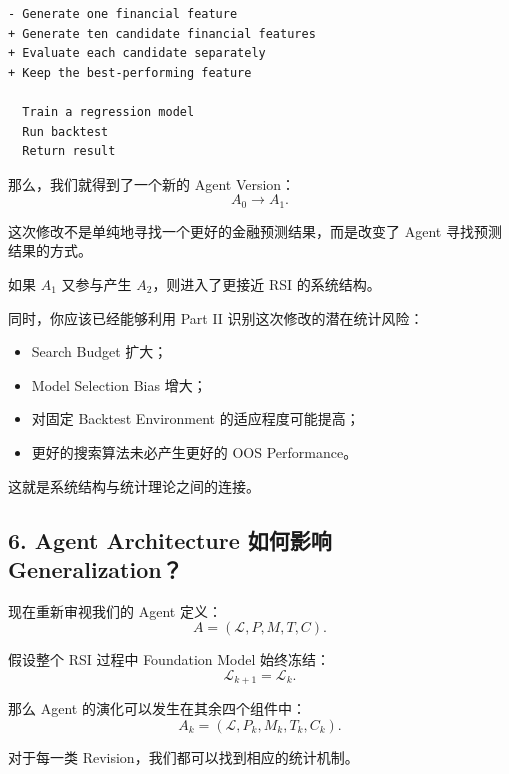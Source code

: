 \begin{verbatim}
- Generate one financial feature
+ Generate ten candidate financial features
+ Evaluate each candidate separately
+ Keep the best-performing feature

  Train a regression model
  Run backtest
  Return result
\end{verbatim}

那么，我们就得到了一个新的 Agent Version：
\[A_0\longrightarrow A_1.\]

这次修改不是单纯地寻找一个更好的金融预测结果，而是改变了 Agent 寻找预测结果的方式。

如果 \(A_1\) 又参与产生 \(A_2\)，则进入了更接近 RSI 的系统结构。

同时，你应该已经能够利用 Part II 识别这次修改的潜在统计风险：

\begin{itemize}
\tightlist
\item
  Search Budget 扩大；
\item
  Model Selection Bias 增大；
\item
  对固定 Backtest Environment 的适应程度可能提高；
\item
  更好的搜索算法未必产生更好的 OOS Performance。
\end{itemize}

这就是系统结构与统计理论之间的连接。

\hypertarget{part-3-31-0001-agent-architecture-ux5982ux4f55ux5f71ux54cd-generalization}{%
\subsection{6. Agent Architecture 如何影响 Generalization？}\label{part-3-31-0001-agent-architecture-ux5982ux4f55ux5f71ux54cd-generalization}}

现在重新审视我们的 Agent 定义：
\[A=(\mathcal L,P,M,T,C).\]

假设整个 RSI 过程中 Foundation Model 始终冻结：
\[\mathcal L_{k+1}=\mathcal L_k.\]

那么 Agent 的演化可以发生在其余四个组件中：
\[A_k=(\mathcal L,P_k,M_k,T_k,C_k).\]

对于每一类 Revision，我们都可以找到相应的统计机制。

